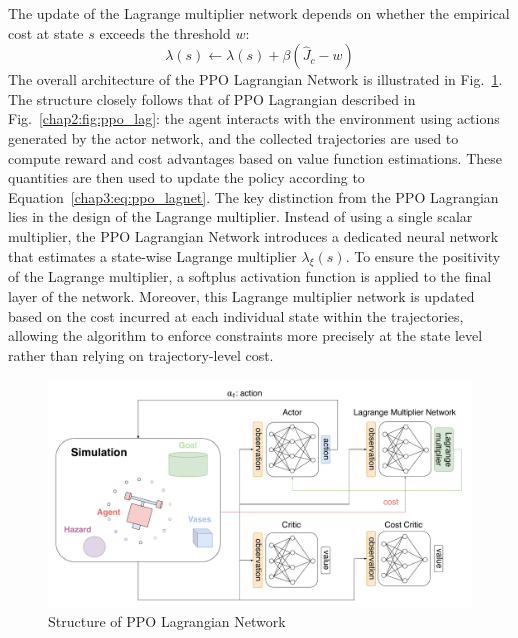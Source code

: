 The update of the Lagrange multiplier network depends on whether the empirical cost at state $s$ exceeds the threshold $w$:
\begin{equation}
  \lambda(s) \leftarrow \lambda(s) + \beta(\hat{J}_c - w)
\end{equation}
The overall architecture of the PPO Lagrangian Network is illustrated in Fig.~\ref{chap3:fig:ppo_lagnet}. 
The structure closely follows that of PPO Lagrangian described in Fig.~\ref{chap2:fig:ppo_lag}: 
the agent interacts with the environment using actions generated by the actor network, and the collected trajectories are used to compute reward and cost advantages based on value function estimations. 
These quantities are then used to update the policy according to Equation~\ref{chap3:eq:ppo_lagnet}.
The key distinction from the PPO Lagrangian lies in the design of the Lagrange multiplier. 
Instead of using a single scalar multiplier, the PPO Lagrangian Network introduces a dedicated neural network that estimates a state-wise Lagrange multiplier $\lambda_\xi(s)$. 
To ensure the positivity of the Lagrange multiplier, a softplus activation function is applied to the final layer of the network. 
Moreover, this Lagrange multiplier network is updated based on the cost incurred at each individual state within the trajectories, allowing the algorithm to enforce constraints more precisely at the state level rather than relying on trajectory-level cost.
\begin{figure}[h]
  \centering
  \includegraphics[width=1.0\textwidth]{imgs/chap3/ppo_lagnet.pdf}
  \caption{Structure of PPO Lagrangian Network}
  \label{chap3:fig:ppo_lagnet}
\end{figure}

